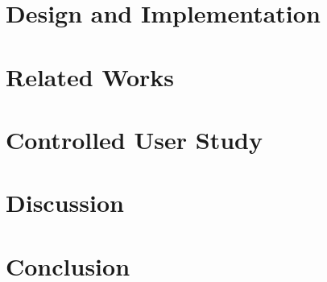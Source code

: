 \documentclass[draft]{IEEEtran}
\begin{document}
\section{Design and Implementation}



\section{Related Works}
\label{sec:related_works}



\section{Controlled User Study}
\label{sec:study}



\section{Discussion}
\label{sec:discussion}



\section{Conclusion}
\label{sec:conclusion}



\balance




\end{document}
